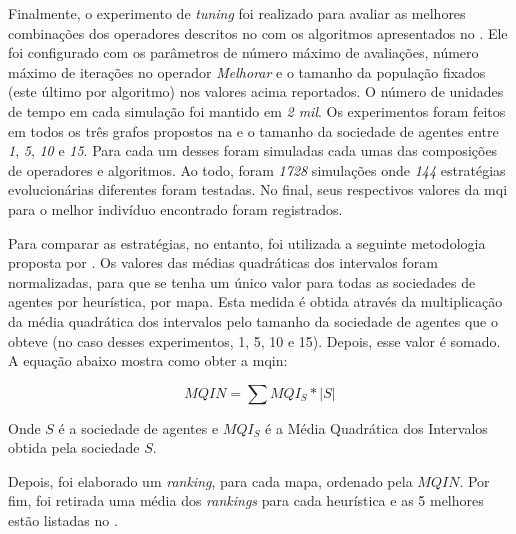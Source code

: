 Finalmente, o experimento de \textit{tuning} foi realizado para avaliar as 
melhores combinações dos operadores descritos no  com 
os algoritmos apresentados no . Ele foi configurado com os 
parâmetros de número máximo de avaliações, número máximo de iterações no 
operador \textit{Melhorar} e o tamanho da população fixados (este último por 
algoritmo) nos valores acima reportados. O número de unidades de tempo em cada 
simulação foi mantido em \textit{2 mil}. Os experimentos foram feitos em todos 
os três grafos propostos na  e o tamanho da sociedade de 
agentes entre \textit{1}, \textit{5}, \textit{10} e \textit{15}. Para cada um 
desses foram simuladas cada umas das composições de operadores e algoritmos. Ao 
todo, foram \textit{1728} simulações onde \textit{144} estratégias 
evolucionárias diferentes foram testadas. No final, seus respectivos valores da 
\ac{mqi} para o melhor indivíduo encontrado foram registrados. 

Para comparar as estratégias, no entanto, foi utilizada a seguinte metodologia 
proposta por \citep{sampaiophd}. Os valores das médias quadráticas dos 
intervalos foram normalizadas, para que se tenha um único valor para todas as 
sociedades de agentes por heurística, por mapa. Esta medida é obtida através da 
multiplicação da média quadrática dos intervalos pelo tamanho da sociedade de 
agentes que o obteve (no caso desses experimentos, 1, 5, 10 e 15). Depois, esse 
valor é somado. A equação abaixo mostra como obter a \ac{mqin}:

$$MQIN = \sum MQI_{S} * |S|$$

Onde $S$ é a sociedade de agentes e $MQI_{S}$ é a Média Quadrática dos 
Intervalos obtida pela sociedade $S$.

Depois, foi elaborado um \textit{ranking}, para cada mapa, ordenado pela $MQIN$. 
Por fim, foi retirada uma média dos \textit{rankings} para cada heurística e as 5 
melhores estão listadas no .

